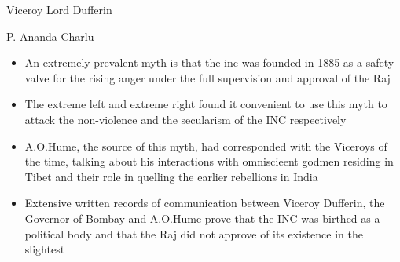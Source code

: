 \begin{marginfigure}[-0.25in]
    \caption{Viceroy Lord Dufferin}
    \vspace{0.8in}
    \caption{P. Ananda Charlu}
\end{marginfigure}

\begin{itemize}
    \item An extremely prevalent myth is that the \gls{inc} was founded in 1885 as a safety valve for the  rising anger under the full supervision and approval of the Raj
    \item The extreme left and extreme right found it convenient to use this myth to attack the non-violence and the secularism of the INC respectively
    \item A.O.Hume, the source of this myth, had corresponded with the Viceroys of the time, talking about his interactions with omniscieent godmen residing in Tibet and their role in quelling the earlier rebellions in India
    \item Extensive written records of communication between Viceroy Dufferin, the Governor of Bombay and A.O.Hume prove that the INC was birthed as a political body and that the Raj did not approve of its existence in the slightest
\end{itemize}

